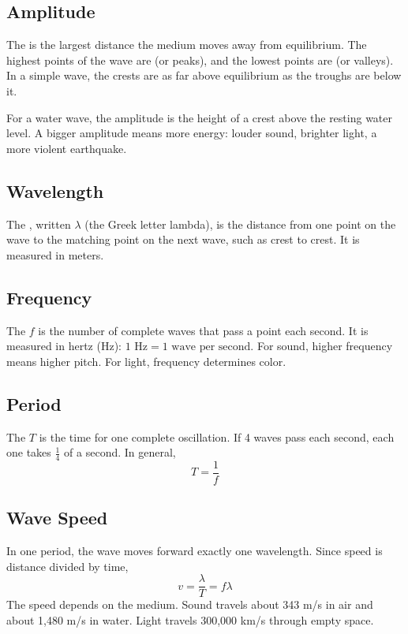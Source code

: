 \subsection*{Amplitude}
The  is the largest distance the medium
moves away from equilibrium. The highest points of the wave are
 (or peaks), and the lowest points are 
(or valleys). In a simple wave, the crests are as far above equilibrium as
the troughs are below it.

For a water wave, the amplitude is the height of a crest above the resting
water level. A bigger amplitude means more energy: louder sound, brighter
light, a more violent earthquake.

\subsection*{Wavelength}
The , written $\lambda$ (the Greek
letter lambda), is the distance from one point on the wave to the matching
point on the next wave, such as crest to crest. It is measured in meters.

\subsection*{Frequency}
The  $f$ is the number of complete
waves that pass a point each second. It is measured in hertz (Hz):
$1 \text{ Hz} = 1 \text{ wave per second}$. For sound, higher frequency
means higher pitch. For light, frequency determines color.

\subsection*{Period}
The  $T$ is the time for one complete
oscillation. If 4 waves pass each second, each one takes $\frac{1}{4}$ of
a second. In general,
$$T = \frac{1}{f}$$

\subsection*{Wave Speed}
In one period, the wave moves forward exactly one wavelength. Since speed
is distance divided by time,
$$v = \frac{\lambda}{T} = f\lambda$$
The speed depends on the medium. Sound travels about 343 m/s in air and
about 1,480 m/s in water. Light travels 300,000 km/s through empty space.

